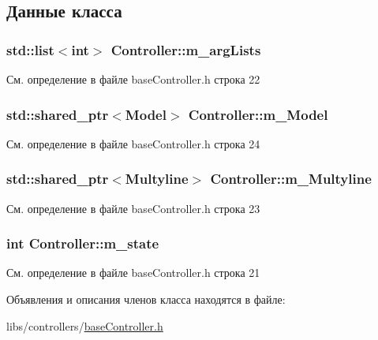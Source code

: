 \subsection{Данные класса}
\hypertarget{class_controller_acaa49bf804d980462e65b7c9df8228ad}{
\subsubsection[{m\-\_\-arg\-Lists}]{\setlength{\rightskip}{0pt plus 5cm}std\-::list$<$int$>$ Controller\-::m\-\_\-arg\-Lists\hspace{0.3cm}{\ttfamily [private]}}}\label{class_controller_acaa49bf804d980462e65b7c9df8228ad}


См. определение в файле base\-Controller.\-h строка 22

\hypertarget{class_controller_a5190c0bded8b780fed2baaf56737b9cb}{
\subsubsection[{m\-\_\-\-Model}]{\setlength{\rightskip}{0pt plus 5cm}std\-::shared\-\_\-ptr$<${\bf Model}$>$ Controller\-::m\-\_\-\-Model\hspace{0.3cm}{\ttfamily [private]}}}\label{class_controller_a5190c0bded8b780fed2baaf56737b9cb}


См. определение в файле base\-Controller.\-h строка 24

\hypertarget{class_controller_a58633f078953ff4035c7fd1fc14ba01c}{
\subsubsection[{m\-\_\-\-Multyline}]{\setlength{\rightskip}{0pt plus 5cm}std\-::shared\-\_\-ptr$<${\bf Multyline}$>$ Controller\-::m\-\_\-\-Multyline\hspace{0.3cm}{\ttfamily [private]}}}\label{class_controller_a58633f078953ff4035c7fd1fc14ba01c}


См. определение в файле base\-Controller.\-h строка 23

\hypertarget{class_controller_a8b090b5fb29c22eb74d6bab24713ce4e}{
\subsubsection[{m\-\_\-state}]{\setlength{\rightskip}{0pt plus 5cm}int Controller\-::m\-\_\-state\hspace{0.3cm}{\ttfamily [private]}}}\label{class_controller_a8b090b5fb29c22eb74d6bab24713ce4e}


См. определение в файле base\-Controller.\-h строка 21



Объявления и описания членов класса находятся в файле\-:\begin{DoxyCompactItemize}
\item 
libs/controllers/\hyperlink{base_controller_8h}{base\-Controller.\-h}\end{DoxyCompactItemize}
